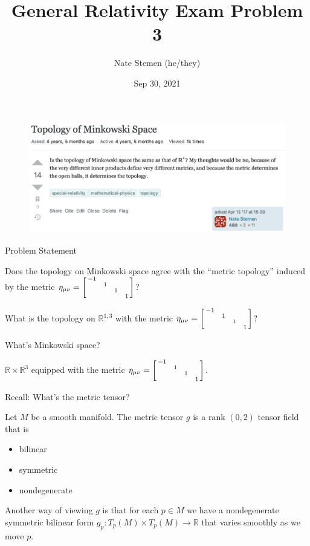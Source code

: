 \documentclass[11pt,aspectratio=1610,xcolor=dvipsnames]{beamer}
\title{General Relativity Exam Problem 3}
\date{Sep 30, 2021}
\author{Nate Stemen (he/they)}
\institute{AMATH 875}
\newcommand{\R}{\mathbb{R}}
\newcommand{\problemstatement}{Does the topology on Minkowski space agree with the ``metric topology'' induced by the metric $\eta_{\mu\nu} = \smqty[-1 & & &  \\ & \phantom{+}1 & & \\ & & \phantom{+}1 & \\ & & & \phantom{+}1]$?}
\newcommand{\problemstatementtwo}{What is the topology on $\R^{1,3}$ with the metric $\eta_{\mu\nu} = \smqty[-1 & & &  \\ & \phantom{+}1 & & \\ & & \phantom{+}1 & \\ & & & \phantom{+}1]$?}
\begin{document}
\maketitle

\begin{frame}
	\begin{figure}
		\includegraphics[width=.8\textwidth]{physSE.png}
	\end{figure}
\end{frame}

\begin{frame}{Problem Statement}
	\large
	\begin{prob}
		\problemstatement
	\end{prob}
	\begin{prob}
		\problemstatementtwo
	\end{prob}
\end{frame}

\begin{frame}{What's Minkowski space?}
	\begin{center}
		\huge $\R\times \R^3$ equipped with the metric $\eta_{\mu\nu} = \smqty[-1 & & &  \\ & \phantom{+}1 & & \\ & & \phantom{+}1 & \\ & & & \phantom{+}1]$.
	\end{center}
\end{frame}

\begin{frame}{Recall: What's the metric tensor?}
	\begin{definition}
		Let $M$ be a smooth manifold.
		The metric tensor $g$ is a rank $(0, 2)$ tensor field that is
		\begin{itemize}
			\item bilinear
			\item symmetric
			\item nondegenerate
		\end{itemize}
	\end{definition}
	\pause
	Another way of viewing $g$ is that for each $p\in M$ we have a nondegenerate symmetric bilinear form $g_p: T_p(M)\times T_p(M) \to \R$ that varies smoothly as we move $p$.
\end{frame}
\end{document}

